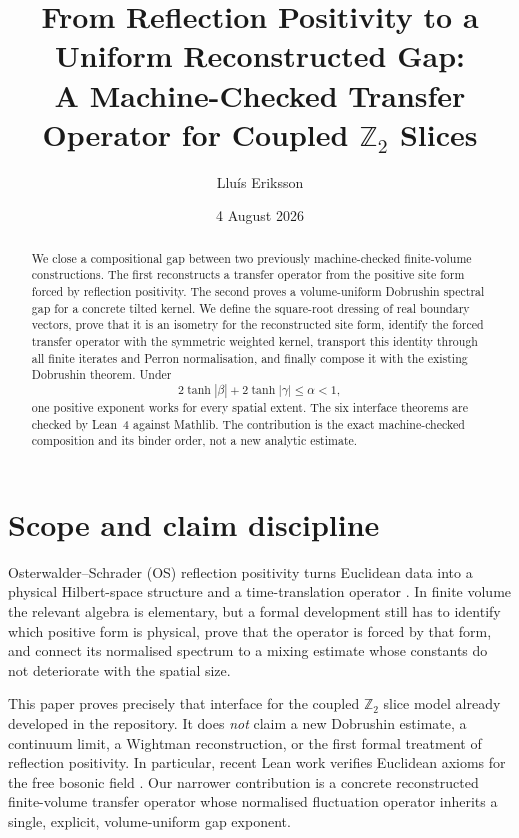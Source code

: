 \documentclass[11pt]{article}
\title{From Reflection Positivity to a Uniform Reconstructed Gap:\\
A Machine-Checked Transfer Operator for Coupled $\mathbb Z_2$ Slices}
\author{Llu\'is Eriksson}
\date{4 August 2026}
\begin{document}
\maketitle

\begin{abstract}
We close a compositional gap between two previously machine-checked finite-volume
constructions.  The first reconstructs a transfer operator from the positive
site form forced by reflection positivity.  The second proves a
volume-uniform Dobrushin spectral gap for a concrete tilted kernel.  We define
the square-root dressing of real boundary vectors, prove that it is an
isometry for the reconstructed site form, identify the forced transfer
operator with the symmetric weighted kernel, transport this identity through
all finite iterates and Perron normalisation, and finally compose it with the
existing Dobrushin theorem.  Under
\[
  2\tanh |\beta|+2\tanh |\gamma|\leq \alpha<1,
\]
one positive exponent works for every spatial extent.  The six interface
theorems are checked by Lean~4 against Mathlib.  The contribution is the exact
machine-checked composition and its binder order, not a new analytic estimate.
\end{abstract}

\section{Scope and claim discipline}

Osterwalder--Schrader (OS) reflection positivity turns Euclidean data into a
physical Hilbert-space structure and a time-translation operator
\cite{OS1,OS2,OsterwalderSeiler}.  In finite volume the relevant algebra is
elementary, but a formal development still has to identify which positive form
is physical, prove that the operator is forced by that form, and connect its
normalised spectrum to a mixing estimate whose constants do not deteriorate
with the spatial size.

This paper proves precisely that interface for the coupled $\mathbb Z_2$ slice
model already developed in the repository.  It does \emph{not} claim a new
Dobrushin estimate, a continuum limit, a Wightman reconstruction, or the first
formal treatment of reflection positivity.  In particular, recent Lean work
verifies Euclidean axioms for the free bosonic field
\cite{DouglasFormalQFT}.  Our narrower contribution is a concrete reconstructed
finite-volume transfer operator whose normalised fluctuation operator inherits
a single, explicit, volume-uniform gap exponent.
\end{document}
